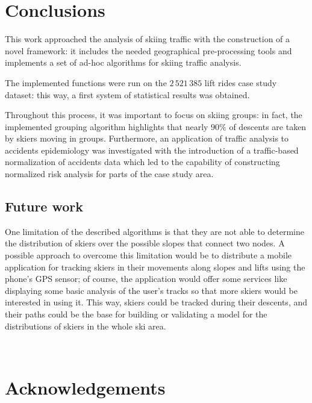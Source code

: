 \documentclass[12pt,a4paper,twoside]{book}
\begin{document}
\chapter{Conclusions}

This work approached the analysis of skiing traffic with the construction of a novel framework: it includes the needed geographical pre-processing tools and implements a set of ad-hoc algorithms for skiing traffic analysis.

The implemented functions were run on the $2\,521\,385$ lift rides case study dataset: this way, a first system of statistical results was obtained.

Throughout this process, it was important to focus on skiing groups: in fact, the implemented grouping algorithm highlights that nearly $90\%$ of descents are taken by skiers moving in groups.
Furthermore, an application of traffic analysis to accidents epidemiology was investigated with the introduction of a traffic-based normalization of accidents data which led to the capability of constructing normalized risk analysis for parts of the case study area.


\section{Future work}
\label{sec:future-work}

 One limitation of the described algorithms is that they are not able to determine the distribution of skiers over the possible slopes that connect two nodes. A possible approach to overcome this limitation would be to distribute a mobile application for tracking skiers in their movements along slopes and lifts using the phone's GPS sensor; of course, the application would offer some services like displaying some basic analysis of the user's tracks so that more skiers would be interested in using it. This way, skiers could be tracked during their descents, and their paths could be the base for building or validating a model for the distributions of skiers in the whole ski area.



{


}




\printglossaries


~\newpage ~\newpage

\chapter*{Acknowledgements}
\end{document}
